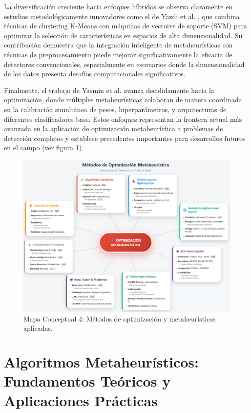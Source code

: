 La diversificación creciente hacia enfoques híbridos se observa claramente en estudios metodológicamente innovadores como el de Yazdi et al. \cite{yazdi2020improving}, que combina técnicas de clustering K-Means con máquinas de vectores de soporte (SVM) para optimizar la selección de características en espacios de alta dimensionalidad. Su contribución demuestra que la integración inteligente de metaheurísticas con técnicas de preprocesamiento puede mejorar significativamente la eficacia de detectores convencionales, especialmente en escenarios donde la dimensionalidad de los datos presenta desafíos computacionales significativos.

Finalmente, el trabajo de Yasmin et al. \cite{yasmin2024ensemble} avanza decididamente hacia la optimización, donde múltiples metaheurísticas colaboran de manera coordinada en la calibración simultánea de pesos, hiperparámetros, y arquitecturas de diferentes clasificadores base. Estos enfoques representan la frontera actual más avanzada en la aplicación de optimización metaheurística a problemas de detección complejos y establece precedentes importantes para desarrollos futuros en el campo (ver figura \ref{fig:mapa_conceptual_4}).

\begin{figure}[h!]
    \centering
    \includegraphics[width=\textwidth]{Imagenes/mapaConceptual4.png}
    \caption{Mapa Conceptual 4: Métodos de optimización y metaheurísticas aplicadas.}
    \label{fig:mapa_conceptual_4}
\end{figure}

\section{Algoritmos Metaheurísticos: Fundamentos Teóricos y Aplicaciones Prácticas}
\label{sec:algoritmos_metaheuristicos}

